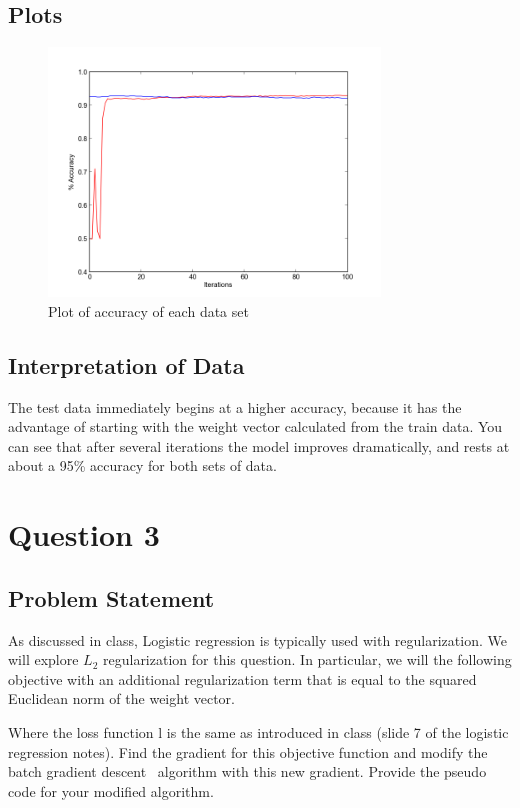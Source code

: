 \documentclass[letterpaper,10pt]{article}
\begin{document}
\subsection{Plots}
     \begin{figure}[ht]
    \centering
   \includegraphics[width=250pt]{gradientDescentImprovement.png}
    \caption{Plot of accuracy of each data set}
    \label{fig:Plot of accuracy over iterations. Red is training data}
    \end{figure}
\subsection{Interpretation of Data}
The test data immediately begins at a higher accuracy, because it has the advantage of starting with the weight vector calculated from the train data. You can see that after several iterations the model improves dramatically, and rests at about a 95\% accuracy for both sets of data.


\section{Question 3}
\subsection{Problem Statement}
As discussed in class, Logistic regression is typically used with regularization. We will explore 
\(L_2\) regularization for this question. In particular, we will the following objective with an 
additional regularization term that is equal to the squared Euclidean norm of the weight vector.

Where the loss function l is the same as introduced in class (slide 7 of the logistic regression 
notes). Find the gradient for this objective function and modify the batch gradient descent \
algorithm with this new gradient. Provide the pseudo code for your modified algorithm.
\end{document}
